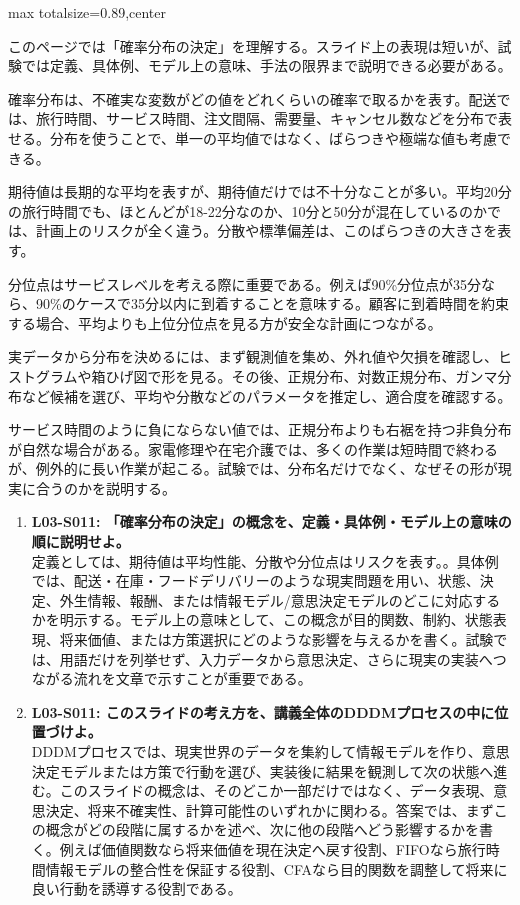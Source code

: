 \begin{minipage}[t]{0.58\textwidth}
\begin{adjustbox}{max totalsize={\textwidth}{0.89\textheight},center}
\begin{minipage}{\textwidth}\scriptsize
{}このページでは「確率分布の決定」を理解する。スライド上の表現は短いが、試験では定義、具体例、モデル上の意味、手法の限界まで説明できる必要がある。\par
確率分布は、不確実な変数がどの値をどれくらいの確率で取るかを表す。配送では、旅行時間、サービス時間、注文間隔、需要量、キャンセル数などを分布で表せる。分布を使うことで、単一の平均値ではなく、ばらつきや極端な値も考慮できる。\par
期待値は長期的な平均を表すが、期待値だけでは不十分なことが多い。平均20分の旅行時間でも、ほとんどが18-22分なのか、10分と50分が混在しているのかでは、計画上のリスクが全く違う。分散や標準偏差は、このばらつきの大きさを表す。\par
分位点はサービスレベルを考える際に重要である。例えば90\%分位点が35分なら、90\%のケースで35分以内に到着することを意味する。顧客に到着時間を約束する場合、平均よりも上位分位点を見る方が安全な計画につながる。\par
実データから分布を決めるには、まず観測値を集め、外れ値や欠損を確認し、ヒストグラムや箱ひげ図で形を見る。その後、正規分布、対数正規分布、ガンマ分布など候補を選び、平均や分散などのパラメータを推定し、適合度を確認する。\par
サービス時間のように負にならない値では、正規分布よりも右裾を持つ非負分布が自然な場合がある。家電修理や在宅介護では、多くの作業は短時間で終わるが、例外的に長い作業が起こる。試験では、分布名だけでなく、なぜその形が現実に合うのかを説明する。\par{}\begin{enumerate}\item \textbf{L03-S011: 「確率分布の決定」の概念を、定義・具体例・モデル上の意味の順に説明せよ。}\\定義としては、期待値は平均性能、分散や分位点はリスクを表す。。具体例では、配送・在庫・フードデリバリーのような現実問題を用い、状態、決定、外生情報、報酬、または情報モデル/意思決定モデルのどこに対応するかを明示する。モデル上の意味として、この概念が目的関数、制約、状態表現、将来価値、または方策選択にどのような影響を与えるかを書く。試験では、用語だけを列挙せず、入力データから意思決定、さらに現実の実装へつながる流れを文章で示すことが重要である。\item \textbf{L03-S011: このスライドの考え方を、講義全体のDDDMプロセスの中に位置づけよ。}\\DDDMプロセスでは、現実世界のデータを集約して情報モデルを作り、意思決定モデルまたは方策で行動を選び、実装後に結果を観測して次の状態へ進む。このスライドの概念は、そのどこか一部だけではなく、データ表現、意思決定、将来不確実性、計算可能性のいずれかに関わる。答案では、まずこの概念がどの段階に属するかを述べ、次に他の段階へどう影響するかを書く。例えば価値関数なら将来価値を現在決定へ戻す役割、FIFOなら旅行時間情報モデルの整合性を保証する役割、CFAなら目的関数を調整して将来に良い行動を誘導する役割である。\end{enumerate}

\end{minipage}
\end{adjustbox}
\end{minipage}
